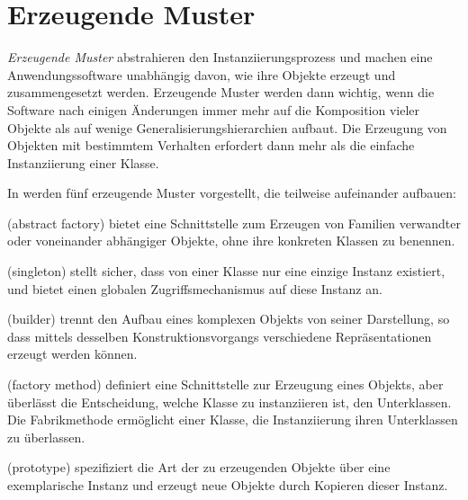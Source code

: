 \section{Erzeugende Muster}
\label{sec:Kap-10.1}

\textit{Erzeugende Muster} abstrahieren den Instanziierungsprozess und machen eine Anwendungssoftware unabhängig davon, wie ihre Objekte erzeugt und zusammen\-gesetzt werden. Erzeugende Muster werden dann wichtig, wenn die Software nach einigen Änderungen immer mehr auf die Komposition vieler Objekte als auf wenige Generalisierungshierarchien aufbaut.
Die Erzeugung von Objekten mit bestimmtem Verhalten erfordert dann mehr als die einfache Instanziierung einer Klasse.

In \cite{gam95} werden fünf erzeugende Muster vorgestellt, die teilweise aufeinander aufbauen:

\begin{description}
	\setlength{\itemsep}{2mm} %
	
	\item[\textit{Abstrakte Fabrik}] (abstract factory) bietet eine Schnittstelle zum Erzeugen von Familien verwandter oder voneinander abhängiger Objekte, ohne ihre konkreten Klassen zu benennen.
	\item[\textit{Einzelstück}] (singleton) stellt sicher, dass von einer Klasse nur eine einzige Instanz existiert, und bietet einen globalen Zugriffsmechanismus auf diese Instanz an.
	\item[\textit{Erbauer}] (builder) trennt den Aufbau eines komplexen Objekts von seiner Darstellung, so dass mittels desselben Konstruktionsvorgangs verschiedene Repräsentationen erzeugt werden können.
	\item[\textit{Fabrikmethode}] (factory method) definiert eine Schnittstelle zur Erzeugung eines Objekts, aber überlässt die Entscheidung, welche Klasse zu instanziieren ist, den Unterklassen. Die Fabrikmethode ermöglicht einer Klasse, die Instanzi\-ierung ihren Unterklassen zu überlassen.
	\item[\textit{Prototyp}] (prototype) spezifiziert die Art der zu erzeugenden Objekte über eine \mbox{exemplarische} Instanz und erzeugt neue Objekte durch Kopieren dieser Instanz.
\end{description}


